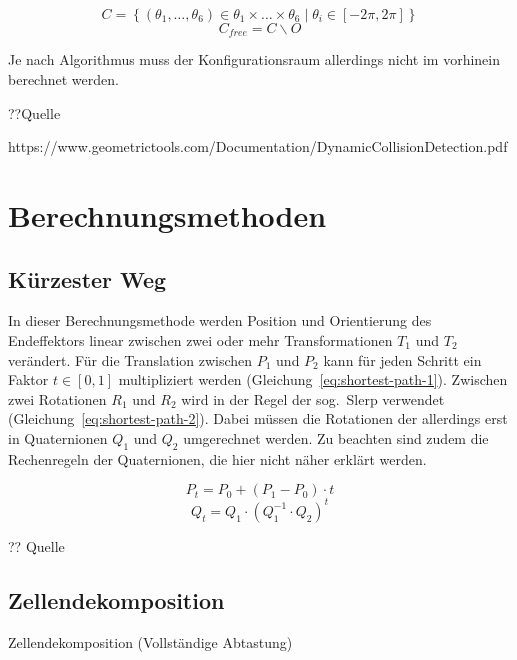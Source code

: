 \begin{equation}
    \mathit{C} = \left\{ \left( \theta_1,\dots,\theta_6 \right) \in \theta_1\times\dots\times\theta_6 \mid \theta_i \in \left[ -2\pi, 2\pi \right]\right\}
    \label{eq:config-1}
\end{equation}
\begin{equation}
    \mathit{C}_{free} = \mathit{C}\backslash\mathit{O}
    \label{eq:config-2}
\end{equation}

Je nach Algorithmus muss der Konfigurationsraum allerdings nicht im vorhinein berechnet werden.

??Quelle

https://www.geometrictools.com/Documentation/DynamicCollisionDetection.pdf

\section{Berechnungsmethoden}

\subsection{Kürzester Weg}\label{subsec:kurzester-weg}

In dieser Berechnungsmethode werden Position und Orientierung des Endeffektors linear zwischen zwei oder mehr Transformationen $T_1$ und $T_2$ verändert.
Für die Translation zwischen $P_1$ und $P_2$ kann für jeden Schritt ein Faktor $t \in \left[0,1\right]$ multipliziert werden (Gleichung~\ref{eq:shortest-path-1}).
Zwischen zwei Rotationen $R_1$ und $R_2$ wird in der Regel der sog.\ Slerp verwendet (Gleichung~\ref{eq:shortest-path-2}).
Dabei müssen die Rotationen der allerdings erst in Quaternionen $Q_1$ und $Q_2$ umgerechnet werden.
Zu beachten sind zudem die Rechenregeln der Quaternionen, die hier nicht näher erklärt werden.

\begin{equation}
    P_{t} = P_0 + \left( P_1 - P_0 \right) \cdot t
    \label{eq:shortest-path-1}
\end{equation}
\begin{equation}
    Q_{t} = Q_1 \cdot \left( Q_1^{-1} \cdot Q_2 \right)^t
    \label{eq:shortest-path-2}
\end{equation}

?? Quelle

\subsection{Zellendekomposition}
Zellendekomposition (Vollständige Abtastung)

